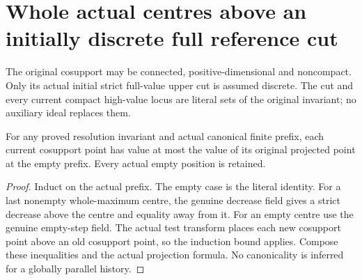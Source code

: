 \section{Whole actual centres above an initially discrete full reference cut}

The original cosupport may be connected, positive-dimensional and
noncompact. Only its actual initial strict full-value upper cut is assumed
discrete. The cut and every current compact high-value locus are literal
sets of the original invariant; no auxiliary ideal replaces them.

\begin{lemma}
\label{hir:original-full-cut-canonical-initial-bound}
\leanok
For any proved resolution invariant and actual canonical finite prefix,
each current cosupport point has value at most the value of its original
projected point at the empty prefix. Every actual empty position is retained.
\end{lemma}
\begin{proof}
Induct on the actual prefix. The empty case is the literal identity. For a
last nonempty whole-maximum centre, the genuine decrease field gives a
strict decrease above the centre and equality away from it. For an empty
centre use the genuine empty-step field. The actual test transform places
each new cosupport point above an old cosupport point, so the induction
bound applies. Compose these inequalities and the actual projection formula.
No canonicality is inferred for a globally parallel history.
\end{proof}


